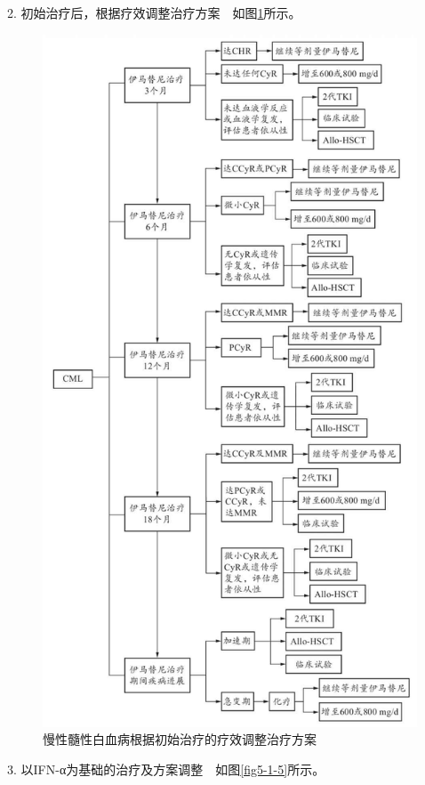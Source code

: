 2. 初始治疗后，根据疗效调整治疗方案　如图\ref{fig5-1-4}所示。

\begin{figure}[!htbp]
 \centering
 \includegraphics{./images/Image00137.jpg}
 \captionsetup{justification=centering}
 \caption{慢性髓性白血病根据初始治疗的疗效调整治疗方案}
 \label{fig5-1-4}
  \end{figure} 

3. 以IFN-α为基础的治疗及方案调整　如图\ref{fig5-1-5}所示。


